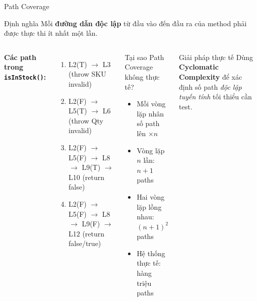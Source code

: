 \documentclass[aspectratio=169,12pt]{beamer}
\begin{document}
\begin{frame}[shrink=12]{Path Coverage}
  \begin{block}{Định nghĩa}
    Mỗi \textbf{đường dẫn độc lập} từ đầu vào đến đầu ra của method
    phải được thực thi ít nhất một lần.
  \end{block}

  \vspace{0.3em}
  \begin{columns}
    \textbf{Các path trong \texttt{isInStock()}:}
    \begin{enumerate}
      \item L2(T) $\to$ L3 (throw SKU invalid)
      \item L2(F) $\to$ L5(T) $\to$ L6 (throw Qty invalid)
      \item L2(F) $\to$ L5(F) $\to$ L8 $\to$ L9(T) $\to$ L10 (return false)
      \item L2(F) $\to$ L5(F) $\to$ L8 $\to$ L9(F) $\to$ L12 (return false/true)
    \end{enumerate}

    \begin{block}{Tại sao Path Coverage không thực tế?}
      \begin{itemize}
        \item Mỗi vòng lặp nhân số path lên $\times n$
        \item Vòng lặp $n$ lần: $n+1$ paths
        \item Hai vòng lặp lồng nhau: $(n+1)^2$ paths
        \item Hệ thống thực tế: hàng triệu paths
      \end{itemize}
    \end{block}
    \begin{exampleblock}{Giải pháp thực tế}
      Dùng \textbf{Cyclomatic Complexity} để xác định số path
      \textit{độc lập tuyến tính} tối thiểu cần test.
    \end{exampleblock}
  \end{columns}
\end{frame}
\end{document}
